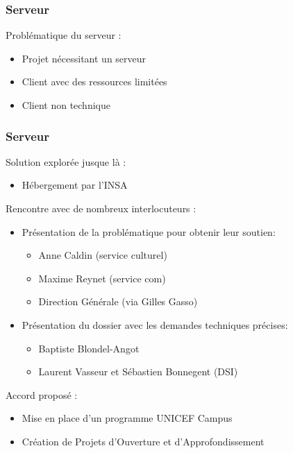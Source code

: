 

\speaker{\Matthieu}

\begin{frame}
	\frametitle{Serveur}
    Problématique du serveur :
      \begin{itemize}
        \item Projet nécessitant un serveur
        \item Client avec des ressources limitées
        \item Client non technique
      \end{itemize}
\end{frame}

\begin{frame}
	\frametitle{Serveur}
	Solution explorée jusque là :
	\begin{itemize}	
    \item Hébergement par l'INSA
    \end{itemize}
\end{frame}
    
\begin{frame}
	 Rencontre avec de nombreux interlocuteurs :
	\begin{itemize}
    	\item Présentation de la problématique pour obtenir leur soutien:
		\begin{itemize}
			\item Anne Caldin (service culturel)
			\item Maxime Reynet (service com)
			\item Direction Générale (via Gilles Gasso)
		\end{itemize}
		\item Présentation du dossier avec les demandes techniques précises:
		\begin{itemize}
			\item Baptiste Blondel-Angot
			\item Laurent Vasseur et Sébastien Bonnegent (DSI)
		\end{itemize}    
	\end{itemize}    
\end{frame}

\begin{frame}
	Accord proposé :
	\begin{itemize}
		\item Mise en place d'un programme UNICEF Campus
		\item Création de Projets d’Ouverture et d’Approfondissement %
	\end{itemize}
\end{frame}

